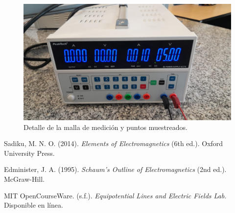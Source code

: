 \documentclass[11pt,twocolumn]{article}
\begin{document}
\begin{figure}[H]
\centering
\includegraphics[width=0.95\columnwidth]{img2.jpg}
\caption{Detalle de la malla de medición y puntos muestreados.}
\label{fig:anexo2}
\end{figure}



\begin{thebibliography}{9}
  
 Sadiku, M. N. O. (2014). \textit{Elements of Electromagnetics} (6th ed.). Oxford University Press.
  
 Edminister, J. A. (1995). \textit{Schaum's Outline of Electromagnetics} (2nd ed.). McGraw-Hill.
  
 MIT OpenCourseWare. (s.f.). \textit{Equipotential Lines and Electric Fields Lab}. Disponible en línea.

\end{thebibliography}
\end{document}
